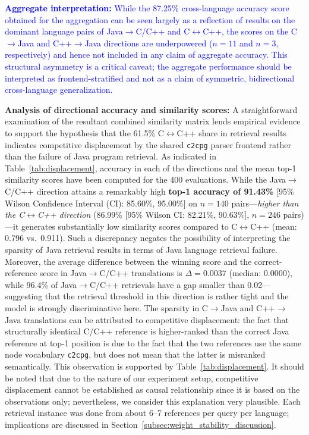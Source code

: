 \textcolor{blue}{\textbf{Aggregate interpretation:} While the 87.25\% cross-language accuracy score obtained for the aggregation can be seen largely as a reflection of results on the dominant language pairs of Java$\rightarrow$C/C++ and C$\leftrightarrow$C++, the scores on the C$\rightarrow$Java and C++$\rightarrow$Java directions are underpowered ($n=11$ and $n=3$, respectively) and hence not included in any claim of aggregate accuracy. This structural asymmetry is a critical caveat; the aggregate performance should be interpreted as frontend-stratified and not as a claim of symmetric, bidirectional cross-language generalization.}

\textbf{Analysis of directional accuracy and similarity scores:} A straightforward examination of the resultant combined similarity matrix lends empirical evidence to support the hypothesis that the 61.5\% C$\leftrightarrow$C++ share in retrieval results indicates competitive displacement by the shared \texttt{c2cpg} parser frontend rather than the failure of Java program retrieval. As indicated in Table~\ref{tab:displacement}, accuracy in each of the directions and the mean top-1 similarity scores have been computed for the 400 evaluations. While the Java$\rightarrow$C/C++ direction attains a remarkably high \textbf{top-1 accuracy of 91.43\%} [95\% Wilson Confidence Interval (CI): 85.60\%, 95.00\%] on $n=140$ pairs---\textit{higher than the C$\leftrightarrow$C++ direction} (86.99\% [95\% Wilson CI: 82.21\%, 90.63\%], $n=246$ pairs)---it generates substantially low similarity scores compared to C$\leftrightarrow$C++ (mean: 0.796 vs.\ 0.911). Such a discrepancy negates the possibility of interpreting the sparsity of Java retrieval results in terms of Java language retrieval failure. Moreover, the average difference between the winning score and the correct-reference score in Java$\rightarrow$C/C++ translations is $\Delta=0.0037$ (median: 0.0000), while 96.4\% of Java$\rightarrow$C/C++ retrievals have a gap smaller than 0.02---suggesting that the retrieval threshold in this direction is rather tight and the model is strongly discriminative here. The sparsity in C$\rightarrow$Java and C++$\rightarrow$Java translations can be attributed to competitive displacement: the fact that structurally identical C/C++ reference is higher-ranked than the correct Java reference at top-1 position is due to the fact that the two references use the same node vocabulary \texttt{c2cpg}, but does not mean that the latter is misranked semantically. This observation is supported by Table~\ref{tab:displacement}. It should be noted that due to the nature of our experiment setup, competitive displacement cannot be established as causal relationship since it is based on the observations only; nevertheless, we consider this explanation very plausible. Each retrieval instance was done from about 6--7 references per query per language; implications are discussed in Section~\ref{subsec:weight_stability_discussion}.
